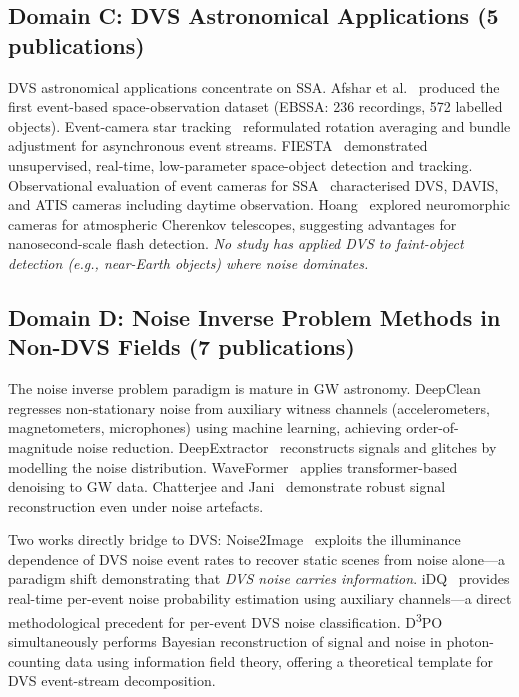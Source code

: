 \documentclass[12pt]{article}
\begin{document}
\subsection{Domain C: DVS Astronomical Applications (5 publications)}

DVS astronomical applications concentrate on SSA.
Afshar et al.~\cite{C1} produced the first event-based space-observation dataset (EBSSA: 236 recordings, 572 labelled objects).
Event-camera star tracking~\cite{C2} reformulated rotation averaging and bundle adjustment for asynchronous event streams.
FIESTA~\cite{C3} demonstrated unsupervised, real-time, low-parameter space-object detection and tracking.
Observational evaluation of event cameras for SSA~\cite{C4} characterised DVS, DAVIS, and ATIS cameras including daytime observation.
Hoang~\cite{C5} explored neuromorphic cameras for atmospheric Cherenkov telescopes, suggesting advantages for nanosecond-scale flash detection.
\emph{No study has applied DVS to faint-object detection (e.g., near-Earth objects) where noise dominates.}

\subsection{Domain D: Noise Inverse Problem Methods in Non-DVS Fields (7 publications)}

The noise inverse problem paradigm is mature in GW astronomy.
DeepClean~\cite{D1} regresses non-stationary noise from auxiliary witness channels (accelerometers, magnetometers, microphones) using machine learning, achieving order-of-magnitude noise reduction.
DeepExtractor~\cite{D2} reconstructs signals and glitches by modelling the noise distribution.
WaveFormer~\cite{D3} applies transformer-based denoising to GW data.
Chatterjee and Jani~\cite{D4} demonstrate robust signal reconstruction even under noise artefacts.

Two works directly bridge to DVS:
Noise2Image~\cite{D5} exploits the illuminance dependence of DVS noise event rates to recover static scenes from noise alone---a paradigm shift demonstrating that \emph{DVS noise carries information}.
iDQ~\cite{D6} provides real-time per-event noise probability estimation using auxiliary channels---a direct methodological precedent for per-event DVS noise classification.
D\textsuperscript{3}PO~\cite{D7} simultaneously performs Bayesian reconstruction of signal and noise in photon-counting data using information field theory, offering a theoretical template for DVS event-stream decomposition.
\end{document}
